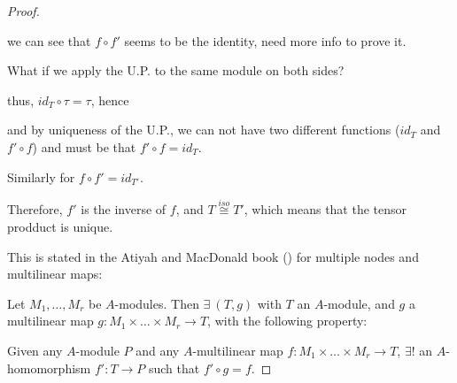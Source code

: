 \documentclass{article}
\theoremstyle{definition}
\newenvironment{prop}[1]
{\renewcommand\theinnerprop{#1}\innerprop}
{\endinnerprop}
\begin{document}
\begin{proof}
\begin{enumerate}[i.]
  we can see that $f \circ f'$ seems to be the identity, need more info to prove it.

  What if we apply the U.P. to the same module on both sides?


    thus, $id_T \circ \tau = \tau$, hence


    and by uniqueness of the U.P., we can not have two different functions ($id_T$ and $f' \circ f$) and must be that $f' \circ f = id_T$.

    Similarly for $f \circ f' = id_{T'}$.

    Therefore, $f'$ is the inverse of $f$, and $T \stackrel{iso}{\cong} T'$, which means that the tensor prodduct is unique.

  \end{enumerate}


  \vspace{1.0cm}
  This is stated in the Atiyah and MacDonald book (\cite{am}) for multiple nodes and multilinear maps:

  \begin{prop}{2.12}
    Let $M_1, \ldots, M_r$ be $A$-modules. Then $\exists ~ (T, g)$ with $T$ an $A$-module, and $g$ a multilinear map $g: M_1 \times \ldots \times M_r \longrightarrow T$, with the following property:

    Given any $A$-module $P$ and any $A$-multilinear map $f: M_1 \times \ldots \times M_r \longrightarrow T$, $\exists !$ an $A$-homomorphism $f': T \longrightarrow P$ such that $f' \circ g = f$.


\end{prop}
\end{proof}
\end{document}
